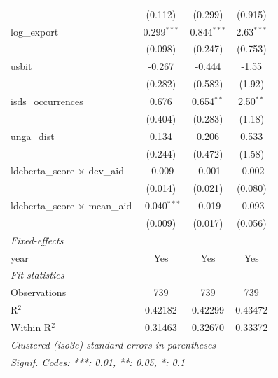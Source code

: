 \begin{tabular}{lccc}
                                         & (0.112)                                     & (0.299)                   & (0.915)\\   
   log\_export                           & 0.299$^{***}$                               & 0.844$^{***}$             & 2.63$^{***}$\\   
                                         & (0.098)                                     & (0.247)                   & (0.753)\\   
   usbit                                 & -0.267                                      & -0.444                    & -1.55\\   
                                         & (0.282)                                     & (0.582)                   & (1.92)\\   
   isds\_occurrences                     & 0.676                                       & 0.654$^{**}$              & 2.50$^{**}$\\   
                                         & (0.404)                                     & (0.283)                   & (1.18)\\   
   unga\_dist                            & 0.134                                       & 0.206                     & 0.533\\   
                                         & (0.244)                                     & (0.472)                   & (1.58)\\   
   ldeberta\_score $\times$ dev\_aid     & -0.009                                      & -0.001                    & -0.002\\   
                                         & (0.014)                                     & (0.021)                   & (0.080)\\   
   ldeberta\_score $\times$ mean\_aid    & -0.040$^{***}$                              & -0.019                    & -0.093\\   
                                         & (0.009)                                     & (0.017)                   & (0.056)\\   
   \midrule
   \emph{Fixed-effects}\\
   year                                  & Yes                                         & Yes                       & Yes\\  
   \midrule
   \emph{Fit statistics}\\
   Observations                          & 739                                         & 739                       & 739\\  
   R$^2$                                 & 0.42182                                     & 0.42299                   & 0.43472\\  
   Within R$^2$                          & 0.31463                                     & 0.32670                   & 0.33372\\  
   \midrule \midrule
   \multicolumn{4}{l}{\emph{Clustered (iso3c) standard-errors in parentheses}}\\
   \multicolumn{4}{l}{\emph{Signif. Codes: ***: 0.01, **: 0.05, *: 0.1}}\\
\end{tabular}
\par\endgroup


